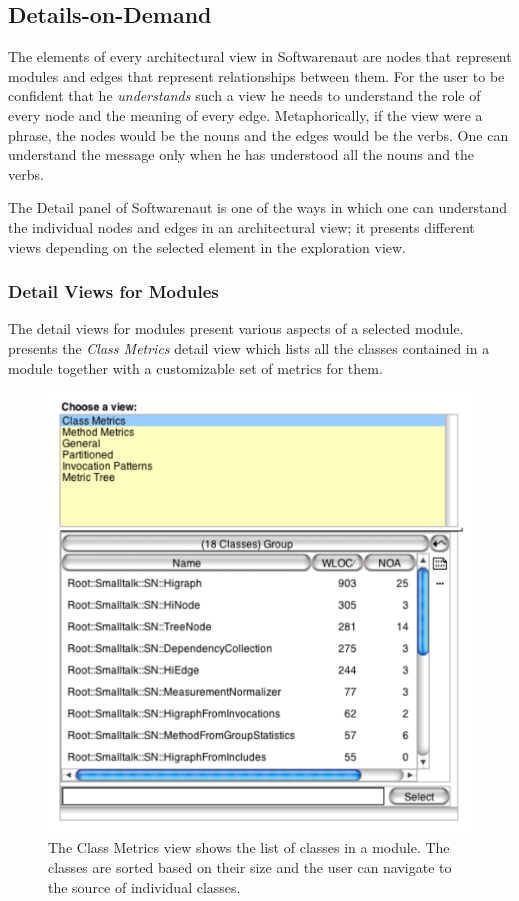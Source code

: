 \documentclass[preprint,12pt]{elsarticle}
\begin{document}
\subsection {Details-on-Demand} 

The elements of every architectural view in Softwarenaut are nodes that represent modules and edges that represent relationships between them. For the user to be confident that he {\em understands} such a view he needs to understand the role of every node and the meaning of every edge. Metaphorically, if the view were a phrase, the nodes would be the nouns and the edges would be the verbs. One can understand the message only when he has understood all the nouns and the verbs.

The Detail panel of Softwarenaut is one of the ways in which one can understand the individual nodes and edges in an architectural view; it presents different views depending on the selected element in the exploration view. 

\subsubsection {Detail Views for Modules}

The detail views for modules present various aspects of a selected module.  presents the {\em Class Metrics} detail view which lists all the classes contained in a module together with a customizable set of metrics for them.

\begin{figure}[ht]
\begin{center}
\includegraphics[width=0.55\linewidth]{DetailForNode}
\caption{The Class Metrics view shows the list of classes in a module. The classes are sorted based on their size and the user can navigate to the source of individual classes.}
\end{center}
\end{figure}
\end{document}
